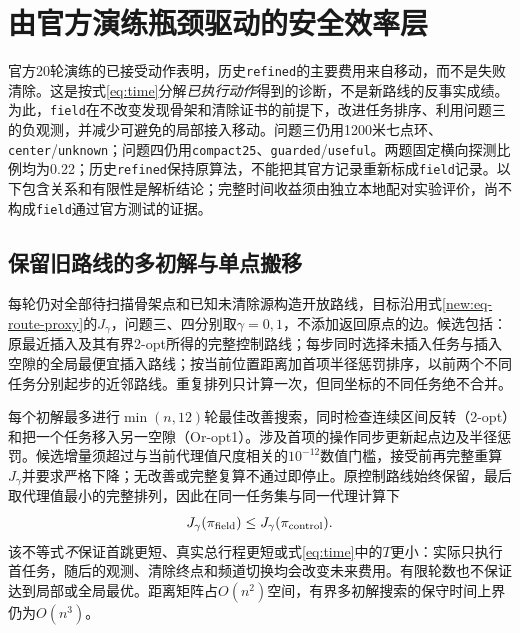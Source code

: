 \section{由官方演练瓶颈驱动的安全效率层}
\label{field:sec-method}
官方20轮演练的已接受动作表明，历史\texttt{refined}的主要费用来自移动，而不是失败清除。这是按式\eqref{eq:time}分解\emph{已执行动作}得到的诊断，不是新路线的反事实成绩。为此，\texttt{field}在不改变发现骨架和清除证书的前提下，改进任务排序、利用问题三的负观测，并减少可避免的局部接入移动。问题三仍用1200米七点环、\texttt{center}/\texttt{unknown}；问题四仍用\texttt{compact25}、\texttt{guarded}/\texttt{useful}。两题固定横向探测比例均为0.22；历史\texttt{refined}保持原算法，不能把其官方记录重新标成\texttt{field}记录。以下包含关系和有限性是解析结论；完整时间收益须由独立本地配对实验评价，尚不构成\texttt{field}通过官方测试的证据。

\subsection{保留旧路线的多初解与单点搬移}
\label{field:sec-route}
每轮仍对全部待扫描骨架点和已知未清除源构造开放路线，目标沿用式\eqref{new:eq-route-proxy}的$J_\gamma$，问题三、四分别取$\gamma=0,1$，不添加返回原点的边。候选包括：原最近插入及其有界2-opt所得的完整控制路线；每步同时选择未插入任务与插入空隙的全局最便宜插入路线；按当前位置距离加首项半径惩罚排序，以前两个不同任务分别起步的近邻路线。重复排列只计算一次，但同坐标的不同任务绝不合并。

每个初解最多进行$\min(n,12)$轮最佳改善搜索，同时检查连续区间反转（2-opt）和把一个任务移入另一空隙（Or-opt1）。涉及首项的操作同步更新起点边及半径惩罚。候选增量须超过与当前代理值尺度相关的$10^{-12}$数值门槛，接受前再完整重算$J_\gamma$并要求严格下降；无改善或完整复算不通过即停止。原控制路线始终保留，最后取代理值最小的完整排列，因此在同一任务集与同一代理计算下
\begin{equation}
 J_\gamma(\pi_{\rm field})\le J_\gamma(\pi_{\rm control}).
 \label{field:eq-proxy-control}
\end{equation}
该不等式\emph{不}保证首跳更短、真实总行程更短或式\eqref{eq:time}中的$T$更小：实际只执行首任务，随后的观测、清除终点和频道切换均会改变未来费用。有限轮数也不保证达到局部或全局最优。距离矩阵占$O(n^2)$空间，有界多初解搜索的保守时间上界仍为$O(n^3)$。

